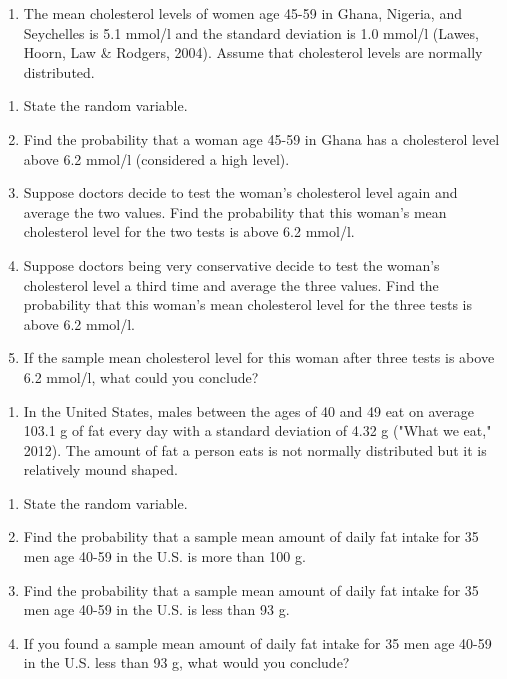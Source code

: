 \documentclass[]{book}
\providecommand{\tightlist}{%
  \setlength{\itemsep}{0pt}\setlength{\parskip}{0pt}}
\begin{document}
\begin{enumerate}
\def\labelenumi{\arabic{enumi}.}
\setcounter{enumi}{5}
\tightlist
\item
  The mean cholesterol levels of women age 45-59 in Ghana, Nigeria, and Seychelles is 5.1 mmol/l and the standard deviation is 1.0 mmol/l (Lawes, Hoorn, Law \& Rodgers, 2004). Assume that cholesterol levels are normally distributed.
\end{enumerate}

\begin{enumerate}
\def\labelenumi{\alph{enumi}.}
\tightlist
\item
  State the random variable.
\item
  Find the probability that a woman age 45-59 in Ghana has a cholesterol level above 6.2 mmol/l (considered a high level).
\item
  Suppose doctors decide to test the woman's cholesterol level again and average the two values. Find the probability that this woman's mean cholesterol level for the two tests is above 6.2 mmol/l.
\item
  Suppose doctors being very conservative decide to test the woman's cholesterol level a third time and average the three values. Find the probability that this woman's mean cholesterol level for the three tests is above 6.2 mmol/l.
\item
  If the sample mean cholesterol level for this woman after three tests is above 6.2 mmol/l, what could you conclude?
\end{enumerate}

\begin{enumerate}
\def\labelenumi{\arabic{enumi}.}
\setcounter{enumi}{6}
\tightlist
\item
  In the United States, males between the ages of 40 and 49 eat on average 103.1 g of fat every day with a standard deviation of 4.32 g ("What we eat," 2012). The amount of fat a person eats is not normally distributed but it is relatively mound shaped.
\end{enumerate}

\begin{enumerate}
\def\labelenumi{\alph{enumi}.}
\tightlist
\item
  State the random variable.
\item
  Find the probability that a sample mean amount of daily fat intake for 35 men age 40-59 in the U.S. is more than 100 g.
\item
  Find the probability that a sample mean amount of daily fat intake for 35 men age 40-59 in the U.S. is less than 93 g.
\item
  If you found a sample mean amount of daily fat intake for 35 men age 40-59 in the U.S. less than 93 g, what would you conclude?
\end{enumerate}
\end{document}
